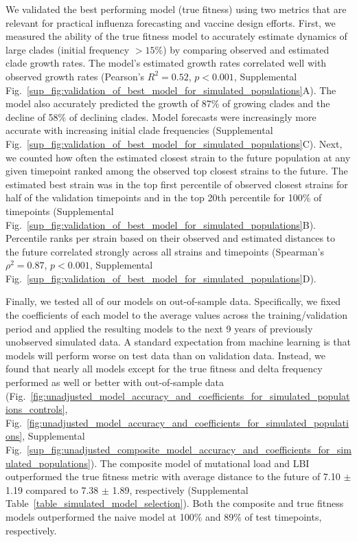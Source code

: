 We validated the best performing model (true fitness) using two metrics that are relevant for practical influenza forecasting and vaccine design efforts.
First, we measured the ability of the true fitness model to accurately estimate dynamics of large clades (initial frequency $>15\%$) by comparing observed and estimated clade growth rates.
The model's estimated growth rates correlated well with observed growth rates (Pearson's $R^2 = 0.52$, $p < 0.001$, Supplemental Fig.~\ref{sup_fig:validation_of_best_model_for_simulated_populations}A).
The model also accurately predicted the growth of 87\% of growing clades and the decline of 58\% of declining clades.
Model forecasts were increasingly more accurate with increasing initial clade frequencies (Supplemental Fig.~\ref{sup_fig:validation_of_best_model_for_simulated_populations}C).
Next, we counted how often the estimated closest strain to the future population at any given timepoint ranked among the observed top closest strains to the future.
The estimated best strain was in the top first percentile of observed closest strains for half of the validation timepoints and in the top 20th percentile for 100\% of timepoints (Supplemental Fig.~\ref{sup_fig:validation_of_best_model_for_simulated_populations}B).
Percentile ranks per strain based on their observed and estimated distances to the future correlated strongly across all strains and timepoints (Spearman's $\rho^2 = 0.87$, $p < 0.001$, Supplemental Fig.~\ref{sup_fig:validation_of_best_model_for_simulated_populations}D).

Finally, we tested all of our models on out-of-sample data.
Specifically, we fixed the coefficients of each model to the average values across the training/validation period and applied the resulting models to the next 9 years of previously unobserved simulated data.
A standard expectation from machine learning is that models will perform worse on test data than on validation data.
Instead, we found that nearly all models except for the true fitness and delta frequency performed as well or better with out-of-sample data (Fig.~\ref{fig:unadjusted_model_accuracy_and_coefficients_for_simulated_populations_controls}, Fig.~\ref{fig:unadjusted_model_accuracy_and_coefficients_for_simulated_populations}, Supplemental Fig.~\ref{sup_fig:unadjusted_composite_model_accuracy_and_coefficients_for_simulated_populations}).
The composite model of mutational load and LBI outperformed the true fitness metric with average distance to the future of 7.10 $\pm$ 1.19 compared to 7.38 $\pm$ 1.89, respectively (Supplemental Table~\ref{table_simulated_model_selection}).
Both the composite and true fitness models outperformed the naive model at 100\% and 89\% of test timepoints, respectively.

